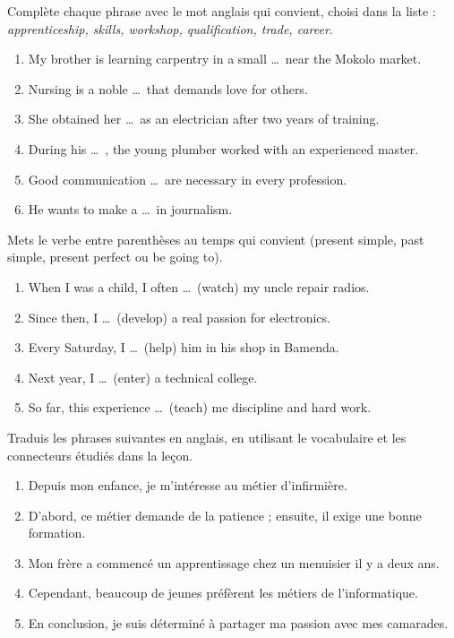 \documentclass[11pt]{article}
\newcounter{popsec}
\newcounter{popsub}
\newcommand{\courssub}[1]{%
  \stepcounter{popsub}%
  \par\vspace{9pt}\noindent{\popxbold\fontsize{11.5}{13}\selectfont\color{popink}{\color{poporange}\thepopsec.\thepopsub}\hspace{6pt}#1}\par\nopagebreak\vspace{4pt}
}
\begin{document}
\begin{exercice}
Complète chaque phrase avec le mot anglais qui convient, choisi dans la liste : \emph{apprenticeship, skills, workshop, qualification, trade, career}.

\begin{enumerate}
\item My brother is learning carpentry in a small \ldots\ near the Mokolo market.
\item Nursing is a noble \ldots\ that demands love for others.
\item She obtained her \ldots\ as an electrician after two years of training.
\item During his \ldots\ , the young plumber worked with an experienced master.
\item Good communication \ldots\ are necessary in every profession.
\item He wants to make a \ldots\ in journalism.
\end{enumerate}
\end{exercice}

\begin{exercice}
Mets le verbe entre parenthèses au temps qui convient (present simple, past simple, present perfect ou be going to).

\begin{enumerate}
\item When I was a child, I often \ldots\ (watch) my uncle repair radios.
\item Since then, I \ldots\ (develop) a real passion for electronics.
\item Every Saturday, I \ldots\ (help) him in his shop in Bamenda.
\item Next year, I \ldots\ (enter) a technical college.
\item So far, this experience \ldots\ (teach) me discipline and hard work.
\end{enumerate}
\end{exercice}

\courssub{Je m'entraîne}

\begin{exercice}[Traduction]
Traduis les phrases suivantes en anglais, en utilisant le vocabulaire et les connecteurs étudiés dans la leçon.

\begin{enumerate}
\item Depuis mon enfance, je m'intéresse au métier d'infirmière.
\item D'abord, ce métier demande de la patience ; ensuite, il exige une bonne formation.
\item Mon frère a commencé un apprentissage chez un menuisier il y a deux ans.
\item Cependant, beaucoup de jeunes préfèrent les métiers de l'informatique.
\item En conclusion, je suis déterminé à partager ma passion avec mes camarades.
\end{enumerate}
\end{exercice}
\end{document}
